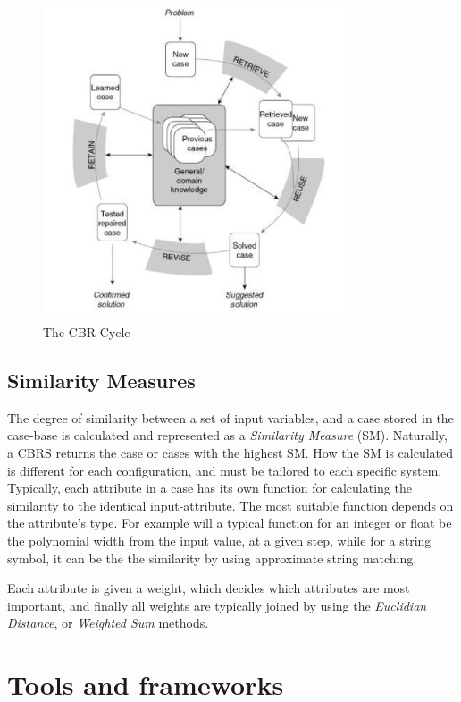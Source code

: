 \begin{figure}[H]
    \centering
    \includegraphics[width=0.8\textwidth]{fig/cbr_cycle.jpg}
    \caption{The CBR Cycle}
    \label{fig:cbr_cycle}
\end{figure}

\subsection{Similarity Measures}
The degree of similarity between a set of input variables, and a case stored in the case-base is calculated and represented as a \emph{Similarity Measure} (SM). Naturally, a CBRS returns the case or cases with the highest SM. How the SM is calculated is different for each configuration, and must be tailored to each specific system. Typically, each attribute in a case has its own function for calculating the similarity to the identical input-attribute. The most suitable function depends on the attribute's type. For example will a typical function for an integer or float be the polynomial width from the input value, at a given step, while for a string symbol, it can be the the similarity by using approximate string matching. 

Each attribute is given a weight, which decides which attributes are most important, and finally all weights are typically joined by using the \emph{Euclidian Distance}, or \emph{Weighted Sum} methods.

\section{Tools and frameworks}

